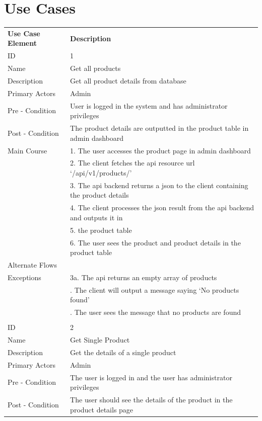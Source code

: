 \documentclass{report}
\begin{document}
\chapter{Use Cases}
\label{chpt: Use Cases}
\begin{tabular}{ l l }
\textbf{Use Case Element} & \textbf{Description} \\
ID 					& 1 \\
Name 				& Get all products \\
Description 			& Get all product details from database \\ 
Primary Actors 		& Admin \\
Pre - Condition 		& User is logged in the system and has administrator privileges \\ 
Post - Condition 	& The product details are outputted in the product table in admin dashboard \\ 
Main Course			& 1. The user accesses the product page in admin dashboard \\
 					& 2. The client fetches the api resource url ‘/api/v1/products/’ \\
 					& 3. The api backend returns a json to the client containing the product details \\ 
 					& 4. The client processes the json result from the api backend and outputs it in \\
 					& 5. the product table \\
 					& 6. The user sees the product and product details in the product table \\
Alternate Flows		& \\
Exceptions 			& 3a. The api returns an empty array of products\\ 
					& \qquad 1. The client will output a message saying ‘No products found’ \\
					& \qquad 2. The user sees the message that no products are found \\ \\
ID 					& 2 \\
Name 				& Get Single Product\\
Description 			& Get the details of a single product \\ 
Primary Actors 		& Admin\\
Pre - Condition 		& The user is logged in and the user has administrator privileges \\ 
Post - Condition 	& The user should see the details of the product in the product details page \\ 

\end{tabular}
\end{document}
